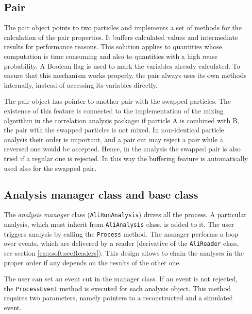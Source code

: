 \documentclass[12pt,a4paper,twoside]{article}
\begin{document}
{\subsection{Pair}

The pair object points to two particles and implements
a set of methods for the calculation of the  pair properties.
It buffers calculated values and intermediate
results for performance reasons. This solution applies to
quantities whose computation is time consuming and
also to quantities with a high reuse probability. A
Boolean flag is used to mark the variables already calculated. 
To ensure that this mechanism works properly, 
the pair always uses its own methods internally, 
instead of accessing its variables directly.

The pair object has pointer to another pair with the swapped
particles. The existence of this feature is connected to
the implementation of the mixing algorithm in the correlation 
analysis package: if particle A is combined with B, 
the pair with the swapped particles is not mixed. 
In non-identical particle analysis their order is important, and
a pair cut may reject a pair while a reversed one would be
accepted. Hence, in the analysis the swapped pair is also tried 
if a regular one is rejected. In this way the buffering feature is
automatically used also for the swapped pair.


\subsection{Analysis manager class and base class}

The {\it analysis manager} class (\texttt{AliRunAnalysis}) drives all
the process. A particular analysis, which must inherit from 
\texttt{AliAnalysis} class, is added to it. 
The user triggers analysis by calling the \texttt{Process} method. 
The manager performs a loop over events, which are delivered by 
a reader (derivative of the \texttt{AliReader} class, see section 
\ref{cap:soft:secReaders}).
This design allows to chain the analyses in the proper order if any 
depends on the results of the other one. 

The user can set an event cut in the manager class.
If an event is not rejected, the \texttt{ProcessEvent}
method is executed for each analysis object. 
This method requires two parameters, namely pointers to 
a reconstructed and a simulated event. 

}
\end{document}
